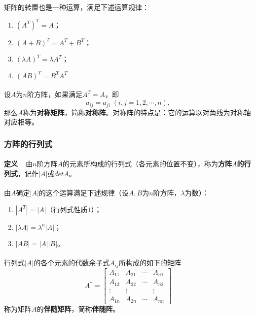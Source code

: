 \paragraph{}
矩阵的转置也是一种运算，满足下述运算规律：
\begin{enumerate}
  \item $(A^T)^T = A$；
  \item $(A+B)^T = A^T + B^T$；
  \item $(\lambda A)^T = \lambda A^T$；
  \item $(AB)^T = B^TA^T$
\end{enumerate}

\paragraph{}
设$A$为$n$阶方阵，如果满足$A^T=A$，即
\begin{equation*}
  a_{ij}=a_{ji} \; (i,j=1,2,\cdots,n),
\end{equation*}
那么$A$称为\textbf{对称矩阵}，简称\textbf{对称阵}。对称阵的特点是：它的运算以对角线为对称轴对应相等。

\subsubsection{方阵的行列式}\label{方阵的行列式}
\paragraph{}
\textbf{定义~~}由$n$阶方阵$A$的元素所构成的行列式（各元素的位置不变），称为\textbf{方阵$A$的行列式}，记作$|A|$或$detA$。

\paragraph{}
由$A$确定$|A|$的这个运算满足下述规律（设$A,B$为$n$阶方阵，$\lambda$为数）：
\begin{enumerate}
  \item $|A^T|=|A|$（行列式性质$1$）；
  \item $|\lambda A| = \lambda^n|A|$；
  \item $|AB|=|A||B|$。
\end{enumerate}

\paragraph{}
行列式$|A|$的各个元素的代数余子式$A_{ij}$所构成的如下的矩阵
\begin{equation*}
  A^* = \left[\begin{array}{cccc}
    A_{11} & A_{21} & \cdots & A_{n1} \\
    A_{12} & A_{22} & \cdots & A_{n2} \\
    \vdots & \vdots &  & \vdots \\
    A_{1n} & A_{2n} & \cdots & A_{nn}
  \end{array}\right]
\end{equation*}
称为矩阵$A$的\textbf{伴随矩阵}，简称\textbf{伴随阵}。

